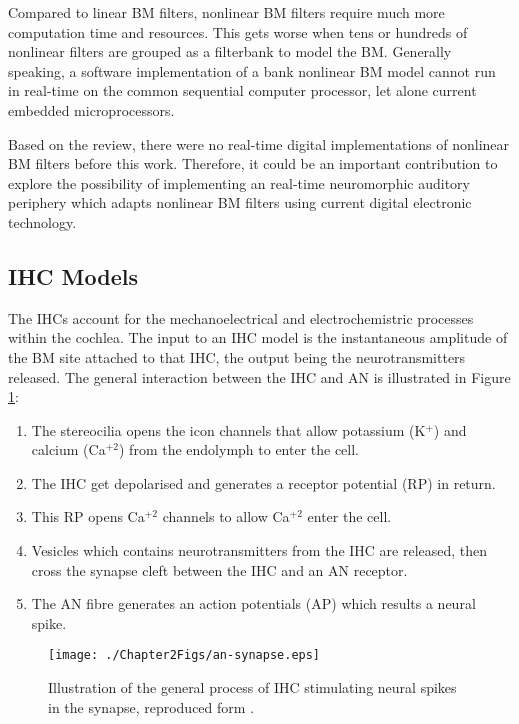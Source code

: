 \documentclass[11pt]{article}
\begin{document}
Compared to linear BM filters, nonlinear BM filters require much more
computation time and resources. This gets worse when tens or hundreds
of nonlinear filters are grouped as a filterbank to model the BM.
Generally speaking, a software implementation of a bank
nonlinear BM model cannot run in real-time on the common sequential
computer processor, let alone current embedded microprocessors.

Based on the review, there were no real-time digital implementations
of nonlinear BM filters before this work. Therefore, it could be an
important contribution to explore the possibility of implementing an
real-time neuromorphic auditory periphery which adapts nonlinear BM
filters using current digital electronic technology.
\subsection{IHC Models}
\label{sec-3-4}
\label{sec:ch2-ihc-models}

The IHCs account for the mechanoelectrical and electrochemistric
processes within the cochlea. The input to an IHC model is the
instantaneous amplitude of the BM site attached to that IHC, the
output being the neurotransmitters released. The general interaction
between the IHC and AN is illustrated in Figure \ref{fig:an-synapse}:

\begin{enumerate}
\item The stereocilia opens the icon channels that allow potassium
   (K$^{+}$) and calcium (Ca$^{\mathrm{+2}}$) from the endolymph to
   enter the cell.
\item The IHC get depolarised and generates a receptor potential (RP)
   in return.
\item This RP opens Ca$^{\mathrm{+2}}$ channels to allow
   Ca$^{\mathrm{+2}}$ enter the cell.
\item Vesicles which contains neurotransmitters from the IHC are
   released, then cross the synapse cleft between the IHC and an AN
   receptor.
\item The AN fibre generates an action potentials (AP) which results a
   neural spike.
\end{enumerate}


\begin{figure}[htb]
\centering
\texttt{[image: ./Chapter2Figs/an-synapse.eps]}
\caption{\label{fig:an-synapse}Illustration of the general process of IHC stimulating neural spikes in the synapse, reproduced form \cite{WikSynapse}.}
\end{figure}
\end{document}
